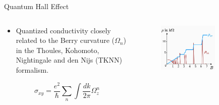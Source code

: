 \documentclass[9pt]{beamer}
\begin{document}
\begin{frame}{Quantum Hall Effect}
  
  \begin{columns}

    \begin{column}{0.5\textwidth}
      \begin{itemize}
        \item Quantized conductivity closely related to the Berry curvature
          ($\Omega_{n}$) in the Thoules, Kohomoto, Nightingale and den Nijs (TKNN) formalism.
      \end{itemize}

      \begin{equation*}
        \sigma_{xy} = \frac{e^{2}}{\hbar} \sum_{n} \int \frac{dk}{2\pi} \Omega_{z}^{n}
      \end{equation*}

    \end{column}

    \begin{column}{0.5\textwidth}
      \begin{figure}
        \includegraphics[width=0.7\textwidth]{quantum_hall}
      \end{figure}
    \end{column}
  \end{columns}

\end{frame}
\end{document}

